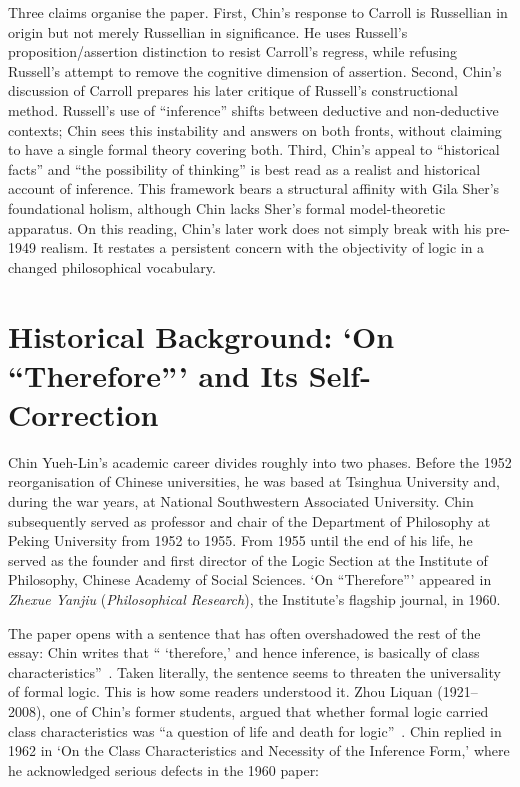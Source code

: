 \documentclass{birkjour}
\begin{document}
Three claims organise the paper. First, Chin's response to Carroll is Russellian in origin but not merely Russellian in significance. He uses Russell's proposition/assertion distinction to resist Carroll's regress, while refusing Russell's attempt to remove the cognitive dimension of assertion. Second, Chin's discussion of Carroll prepares his later critique of Russell's constructional method. Russell's use of ``inference'' shifts between deductive and non-deductive contexts; Chin sees this instability and answers on both fronts, without claiming to have a single formal theory covering both. Third, Chin's appeal to ``historical facts'' and ``the possibility of thinking'' is best read as a realist and historical account of inference. This framework bears a structural affinity with Gila Sher's foundational holism, although Chin lacks Sher's formal model-theoretic apparatus. On this reading, Chin's later work does not simply break with his pre-1949 realism. It restates a persistent concern with the objectivity of logic in a changed philosophical vocabulary.

\section{Historical Background: `On ``Therefore''' and Its Self-Correction}
\label{sec:historical-background}

Chin Yueh-Lin's academic career divides roughly into two phases. Before the 1952 reorganisation of Chinese universities, he was based at Tsinghua University and, during the war years, at National Southwestern Associated University. Chin subsequently served as professor and chair of the Department of Philosophy at Peking University from 1952 to 1955. From 1955 until the end of his life, he served as the founder and first director of the Logic Section at the Institute of Philosophy, Chinese Academy of Social Sciences. `On ``Therefore''' appeared in \textit{Zhexue Yanjiu} (\textit{Philosophical Research}), the Institute's flagship journal, in 1960.

The paper opens with a sentence that has often overshadowed the rest of the essay: Chin writes that `` `therefore,' and hence inference, is basically of class characteristics''~\cite[p.~30]{Liu2017}. Taken literally, the sentence seems to threaten the universality of formal logic. This is how some readers understood it. Zhou Liquan (1921--2008), one of Chin's former students, argued that whether formal logic carried class characteristics was ``a question of life and death for logic''~\cite[p.~12]{Zhou2000}. Chin replied in 1962 in `On the Class Characteristics and Necessity of the Inference Form,' where he acknowledged serious defects in the 1960 paper:
\end{document}
